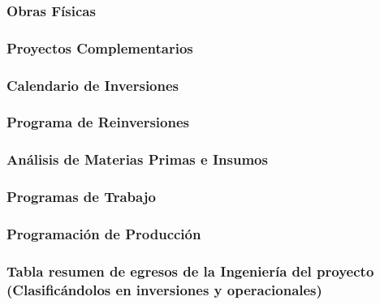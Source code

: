	    \subsubsection{Obras Físicas}
	    \subsubsection{Proyectos Complementarios}
	    \subsubsection{Calendario de Inversiones}
	    \subsubsection{Programa de Reinversiones}
	    \subsubsection{Análisis de Materias Primas e Insumos}
	    \subsubsection{Programas de Trabajo}
	    \subsubsection{Programación de Producción}
	    \subsubsection{Tabla resumen de egresos de la Ingeniería del proyecto (Clasificándolos en inversiones y operacionales)}

